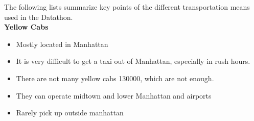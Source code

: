 

%
%
%
%
%
%


The following lists summarize key points of the different transportation means used in the Datathon. \\

\textbf{Yellow Cabs}

\begin{itemize}
\item Mostly located in Manhattan
\item It is very difficult to get a taxi out of Manhattan, especially in rush hours.
\item There are not many yellow cabs 130000, which are not enough.
\item They can operate midtown and lower Manhattan and airports
\item Rarely pick up outside manhattan
\end{itemize}



